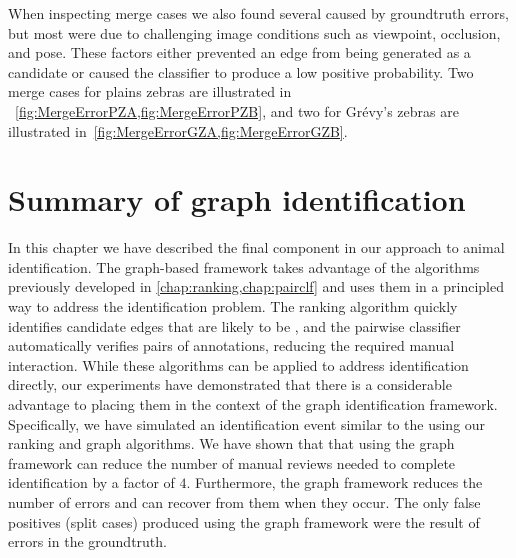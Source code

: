     When inspecting merge cases we also found several caused by groundtruth errors, but most were due to
      challenging image conditions such as viewpoint, occlusion, and pose.
    These factors either prevented an edge from being generated as a candidate or caused the classifier to
      produce a low positive probability.
    Two merge cases for plains zebras are illustrated in ~\cref{fig:MergeErrorPZA,fig:MergeErrorPZB}, and two for
      Grévy's zebras are illustrated in~\cref{fig:MergeErrorGZA,fig:MergeErrorGZB}.


    \SplitErrorsPZ{}

    \SplitErrorsGZ{}

    \MergeErrorPZA{}

    \MergeErrorPZB{}

    \MergeErrorGZA{}

    \MergeErrorGZB{}

 
\FloatBarrier{}
\section{Summary of graph identification}\label{sec:graphconclusion}

In this chapter we have described the final component in our approach to animal identification.
The graph-based framework takes advantage of the algorithms previously developed in
  \cref{chap:ranking,chap:pairclf} and uses them in a principled way to address the identification problem.
The ranking algorithm quickly identifies candidate edges that are likely to be \meaningful{}, and the pairwise
  classifier automatically verifies pairs of annotations, reducing the required manual interaction.
While these algorithms can be applied to address identification directly, our experiments have demonstrated that
  there is a considerable advantage to placing them in the context of the graph identification framework.
Specifically, we have simulated an identification event similar to the \GZC{} using our ranking and graph
  algorithms.
We have shown that that using the graph framework can reduce the number of manual reviews needed to complete
  identification by a factor of $4$.
Furthermore, the graph framework reduces the number of errors and can recover from them when they occur.
The only false positives (split cases) produced using the graph framework were the result of errors in the
  groundtruth.

